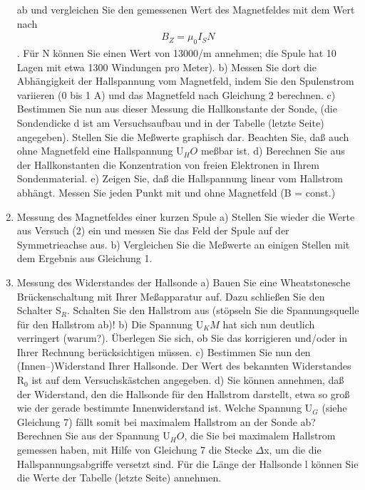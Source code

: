 \documentclass[12pt]{scrartcl}
\begin{document}
\begin{enumerate}
 ab und vergleichen Sie den gemessenen Wert des Magnetfeldes mit dem Wert nach
 \begin{align*}
 B_Z = \mu_0 I_S N
\end{align*} . Für N können Sie einen Wert von 13000/m annehmen; die Spule hat 10 Lagen mit etwa 1300 Windungen pro Meter).
\newline
b) Messen Sie dort die Abhängigkeit der Hallspannung vom Magnetfeld, indem
Sie den Spulenstrom variieren (0 bis 1 A) und das Magnetfeld nach Gleichung
2 berechnen.
\newline
c) Bestimmen Sie nun aus dieser Messung die Hallkonstante der Sonde, (die Sondendicke
d ist am Versuchsaufbau und in der Tabelle (letzte Seite) angegeben). Stellen Sie die Meßwerte graphisch dar. Beachten Sie, daß auch ohne Magnetfeld eine Hallspannung
U$_HO$ meßbar ist.
\newline
d) Berechnen Sie aus der Hallkonstanten die Konzentration von freien Elektronen in Ihrem Sondenmaterial.
e) Zeigen Sie, daß die Hallspannung linear vom Hallstrom abhängt. Messen Sie
jeden Punkt mit und ohne Magnetfeld (B = const.)
\item Messung des Magnetfeldes einer kurzen Spule 
\newline
a) Stellen Sie wieder die Werte aus Versuch (2) ein und messen Sie das Feld der Spule auf der Symmetrieachse aus.
\newline
b) Vergleichen Sie die Meßwerte an einigen Stellen mit dem Ergebnis aus Gleichung 1.
\item Messung des Widerstandes der Hallsonde \newline
a) Bauen Sie eine Wheatstonesche Brückenschaltung mit Ihrer Meßapparatur
auf. Dazu schließen Sie den Schalter
S$_R$. Schalten Sie den Hallstrom aus (stöpseln Sie die Spannungsquelle für den Hallstrom ab)!
\newline
b) Die Spannung U$_KM$ hat sich nun deutlich verringert (warum?).
Überlegen Sie sich, ob Sie das korrigieren und/oder in Ihrer Rechnung berücksichtigen
müssen.
\newline
c) Bestimmen Sie nun den (Innen–)Widerstand Ihrer Hallsonde. Der Wert des bekannten Widerstandes R$_0$ ist auf dem Versuchskästchen angegeben.
\newline
d) Sie können annehmen, daß der Widerstand, den die Hallsonde für den Hallstrom darstellt, etwa so groß wie der gerade bestimmte Innenwiderstand ist. Welche Spannung U$_G$ (siehe Gleichung 7) fällt somit bei maximalem Hallstrom an der Sonde ab? Berechnen Sie aus der Spannung U$_HO$, die Sie bei maximalem Hallstrom gemessen haben, mit Hilfe von Gleichung 7 die Stecke
$\Delta$x, um die die Hallspannungsabgriffe versetzt sind. Für die Länge der Hallsonde
l können Sie die Werte der Tabelle (letzte Seite) annehmen.
\end{enumerate}
\end{document}
